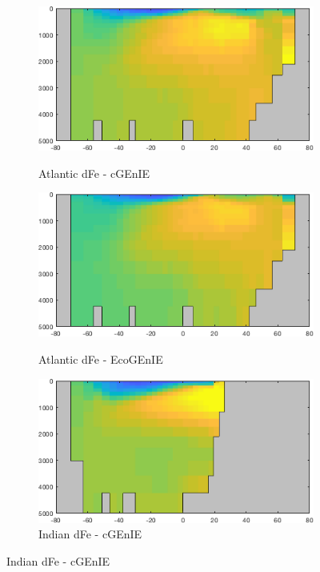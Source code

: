 \documentclass{article}
\begin{document}
\begin{figure}[htp]
 \centering
\begin{subfigure}{.33\textwidth}
 \caption{Atlantic dFe - cGEnIE}
 \includegraphics[width=0.95\linewidth]{../Separate_figures/BIOGEM/Atlantic_ocn_TDFe_profile.png}
 \label{fig:nutrients1}
\end{subfigure}%
\begin{subfigure}{.33\textwidth}
 \caption{Atlantic dFe - EcoGEnIE}
 \includegraphics[width=0.95\linewidth]{../Separate_figures/ECOGEM/Atlantic_ocn_TDFe_profile.png}
 \label{fig:nutrients2}
\end{subfigure}
\begin{subfigure}{.33\textwidth}
 \caption{Indian dFe - cGEnIE}
 \includegraphics[width=0.95\linewidth]{../Separate_figures/BIOGEM/Indian_ocn_TDFe_profile.png}

\end{subfigure}
\end{figure}
\end{document}

